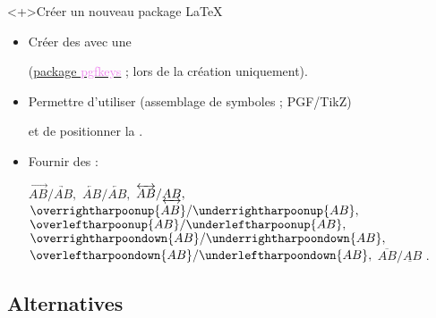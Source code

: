 \documentclass[10pt, aspectratio=3218]{beamer}
\makeatletter
\newcommand*{\pkg}[1]{\textcolor{violet}{\textsf{#1}}}
\newcommand{\rmq}[1]{{\small #1}}
\newcommand{\setoldarrows}{%
  \let\ovar@rightarrow\varrightarrow%
  \let\ovar@leftarrow\varleftarrow%
}
\makeatother
\begin{document}
\begin{frame}[fragile]
\begin{block}
  \end{block}

  \begin{exampleblock}<+>{Créer un nouveau package \LaTeX}
    \begin{itemize}
     \item Créer des  avec une

       (\rmq{\href{https://ctan.org/pkg/pgfkeys}{package \pkg{pgfkeys}} ; lors
       de la création uniquement}).

     \item Permettre d'utiliser  (\rmq{assemblage
       de symboles ; PGF/TikZ})

       et de positionner la .

      \item Fournir des  :

       \begin{center}
       \small\setoldarrows
         $ \overrightarrow{AB}/\underrightarrow{AB}, $
         $ \overleftarrow{AB}/\underleftarrow{AB}, $
         $ \overleftrightarrow{AB}/\underleftrightarrow{AB}, $
         $ \overrightharpoonup{AB}/\underrightharpoonup{AB}, $
         $ \overleftharpoonup{AB}/\underleftharpoonup{AB}, $
         $ \overrightharpoondown{AB}/\underrightharpoondown{AB}, $
         $ \overleftharpoondown{AB}/\underleftharpoondown{AB}, $
         $ \overbar{AB}/\underbar{AB} $%
       .
       \end{center}
     \end{itemize}
   \end{exampleblock}

\end{frame}

\subsection{Alternatives}
\end{document}
